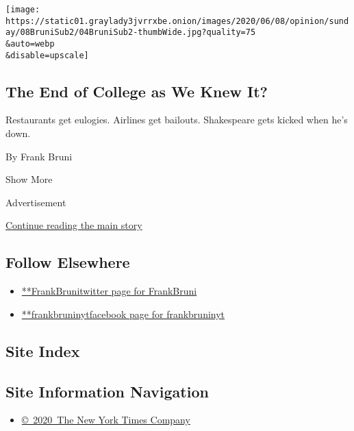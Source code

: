\begin{enumerate}
  \texttt{[image: https://static01.graylady3jvrrxbe.onion/images/2020/06/08/opinion/sunday/08BruniSub2/04BruniSub2-thumbWide.jpg?quality=75\\\&auto=webp\\\&disable=upscale]}

  \hypertarget{the-end-of-college-as-we-knew-it}{%
  \subsection{The End of College as We Knew
  It?}\label{the-end-of-college-as-we-knew-it}}

  Restaurants get eulogies. Airlines get bailouts. Shakespeare gets
  kicked when he's down.

  By Frank Bruni
\end{enumerate}

Show More

Advertisement

\protect\hyperlink{after-mid2}{Continue reading the main story}

\hypertarget{follow-elsewhere}{%
\subsection{Follow Elsewhere}\label{follow-elsewhere}}

\begin{itemize}
\tightlist
\item
  \href{https://twitter.com/FrankBruni}{**FrankBrunitwitter page for
  FrankBruni}
\item
  \href{https://www.facebookcorewwwi.onion/frankbruninyt}{**frankbruninytfacebook
  page for frankbruninyt}
\end{itemize}

\hypertarget{site-index}{%
\subsection{Site Index}\label{site-index}}

\hypertarget{site-information-navigation}{%
\subsection{Site Information
Navigation}\label{site-information-navigation}}

\begin{itemize}
\tightlist
\item
  \href{https://help.nytimes3xbfgragh.onion/hc/en-us/articles/115014792127-Copyright-notice}{©~2020~The
  New York Times Company}
\end{itemize}

